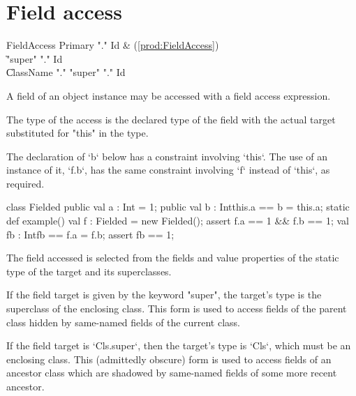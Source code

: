 \section{Field access}
\label{FieldAccess}

\begin{bbgrammar}
         FieldAccess \: Primary \xcd"." Id & (\ref{prod:FieldAccess}) \\
                     \| \xcd"super" \xcd"." Id \\
                     \| ClassName \xcd"." \xcd"super"  \xcd"." Id \\
\end{bbgrammar}

A field of an object instance may be  accessed
with a field access expression.

The type of the access is the declared type of the field with the
actual target substituted for \xcd"this" in the type. 

\begin{ex}
The declaration of \xcd`b` below has a constraint involving \xcd`this`.  
The use of an instance of it, \xcd`f.b`, has the same constraint involving
\xcd`f` instead of \xcd`this`, as required.
\begin{xten}
class Fielded {
  public val a : Int = 1;
  public val b : Int{this.a == b} = this.a;
  static def example() {
    val f : Fielded = new Fielded();
    assert f.a == 1 && f.b == 1;
    val fb : Int{fb == f.a} = f.b;
    assert fb == 1;
  }
}
\end{xten}

\end{ex}

The field accessed is selected from the fields and value properties
of the static type of the target and its superclasses.

If the field target is given by the keyword \xcd"super", the target's type is
the superclass of the enclosing class.  This form is used to access fields of
the parent class hidden by same-named fields of the current class.

If the field target is \xcd`Cls.super`, then the target's type is \xcd`Cls`,
which must be an  enclosing class.  This (admittedly
obscure) form is used to access fields of an ancestor class which are shadowed
by same-named fields of some more recent ancestor.  

